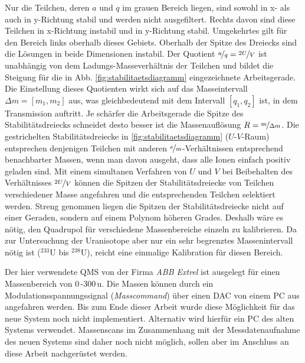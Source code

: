 Nur die Teilchen, deren $a$ und $q$ im grauen
Bereich liegen, sind sowohl in x- als auch in y-Richtung stabil und werden nicht
ausgefiltert. Rechts davon sind diese Teilchen in x-Richtung instabil und in
y-Richtung stabil. Umgekehrtes gilt für den Bereich links oberhalb dieses
Gebiets.
Oberhalb der Spitze des Dreiecks sind die Lösungen in beide Dimensionen
instabil.
Der Quotient $\nicefrac{a}{q}=\nicefrac{2U}{V}$ ist unabhängig von dem
Ladungs-Masseverhältnis der Teilchen und bildet die Steigung für die
in Abb. \ref{fig:stabilitaetsdiagramm} eingezeichnete Arbeitsgerade. Die
Einstellung dieses Quotienten wirkt sich auf das Masseintervall $\Delta m=[m_1,m_2]$ aus, was
gleichbedeutend mit dem Intervall $[q_1,q_2]$ ist, in dem Transmission auftritt.
Je schärfer die Arbeitsgerade die Spitze des Stabilitätsdreiecks schneidet desto besser ist die Massenauflösung
$R=\nicefrac{m}{\Delta m}$. Die gestrichelten Stabilitätsdreiecke in
\ref{fig:stabilitaetsdiagramm}
($U$-$V$-Raum) entsprechen denjenigen Teilchen mit anderen
$\nicefrac{e}{m}$-Verhältnissen entsprechend benachbarter Massen, wenn man davon
ausgeht, dass alle Ionen einfach positiv geladen sind.
Mit einem simultanen Verfahren von $U$ und $V$ bei Beibehalten des Verhältnisses
$\nicefrac{2U}{V}$ können die Spitzen der Stabilitätsdreiecke von Teilchen verschiedener Masse angefahren und die entsprechenden Teilchen
selektiert werden. Streng genommen liegen die Spitzen der
Stabilitätsdreiecke nicht auf einer Geraden, sondern auf einem Polynom höheren
Grades. Deshalb wäre es nötig, den Quadrupol für verschiedene Massenbereiche
einzeln zu kalibrieren. Da zur Untersuchung der Uranisotope aber nur ein sehr
begrenztes Massenintervall nötig ist ($^{233}$U bis $^{238}$U), reicht eine
einmalige Kalibration für diesen Bereich.\par
Der hier verwendete QMS von der Firma \textit{ABB
Extrel} ist ausgelegt für einen Massenbereich von $0\,$-$300\,$u. Die Massen
können durch ein Modulationsspannungssignal (\textit{Masscommand}) über einen
DAC von einem PC aus angefahren werden. Bis zum Ende dieser Arbeit wurde diese
Möglichkeit für das neue System noch nicht implementiert. Alternativ wird
hierfür ein PC des alten Systems verwendet. Massenscans im Zusammenhang mit der
Messdatenaufnahme des neuen Systems sind daher noch nicht möglich, sollen aber
im Anschluss an diese Arbeit nachgerüstet werden.

